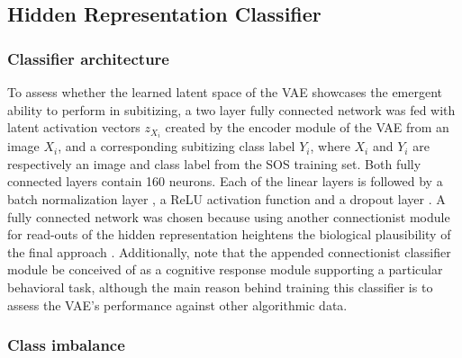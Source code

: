\documentclass[twocolumn]{article}
\begin{document}
\hypertarget{readout}{%
\subsection{Hidden Representation Classifier}\label{readout}}

\hypertarget{classifierarch}{%
\subsubsection{Classifier architecture}\label{classifierarch}}

To assess whether the learned latent space of the VAE showcases the
emergent ability to perform in subitizing, a two layer fully connected
network was fed with latent activation vectors \(z_{X_i}\) created by the
encoder module of the VAE from an image \(X_i\), and a corresponding
subitizing class label \(Y_i\), where \(X_i\) and \(Y_i\) are
respectively an image and class label from the SOS training set. Both
fully connected layers contain 160 neurons. Each of the linear layers is
followed by a batch normalization layer \citep{ioffe2015batch}, a ReLU
activation function and a dropout layer \citep{srivastava2014dropout}. A fully connected
network was chosen because using another connectionist module for read-outs
of the hidden representation heightens the biological plausibility of
the final approach \citep{zorzi2013modeling}. Additionally,
\citet{zorzi2013modeling} note that the appended connectionist
classifier module be conceived of as a cognitive response module
supporting a particular behavioral task, although the main reason behind
training this classifier is to assess the VAE's performance against other
algorithmic data.

\hypertarget{imbalance}{
\subsubsection{Class imbalance}\label{imbalance}}
\end{document}
